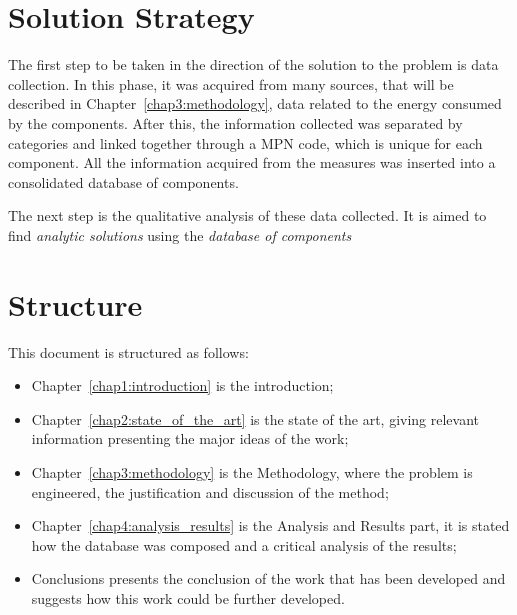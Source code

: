 \section{Solution Strategy} \label{sec1:solution_strategy}
    The first step to be taken in the direction of the solution to the problem is data collection. In this phase, it was acquired from many sources, that will be described in Chapter~\ref{chap3:methodology}, data related to the energy consumed by the components. After this, the information collected was separated by categories and linked together through a MPN code, which is unique for each component. All the information acquired from the measures was inserted into a consolidated database of components.
    
    The next step is the qualitative analysis of these data collected. It is aimed to find \emph{analytic solutions} using the \emph{database of components}


\section{Structure} \label{sec1:structure}
    This document is structured as follows:
    \begin{itemize}
        \item Chapter~\ref{chap1:introduction} is the introduction;
        \item Chapter~\ref{chap2:state_of_the_art} is the state of the art, giving relevant information presenting the major ideas of the work;
        \item Chapter~\ref{chap3:methodology} is the Methodology, where the problem is engineered, the justification and discussion of the method;
        \item Chapter~\ref{chap4:analysis_results} is the Analysis and Results part, it is stated how the database was composed and a critical analysis of the results;
        \item Conclusions presents the conclusion of the work that has been developed and suggests how this work could be further developed.

    \end{itemize}
    
    
